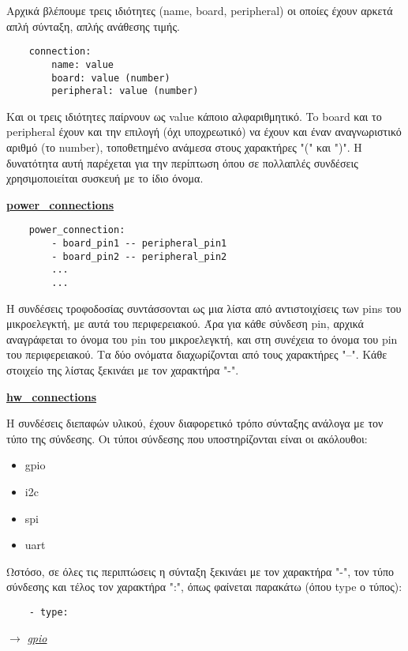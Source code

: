 Αρχικά βλέπουμε τρεις ιδιότητες (name, board, peripheral) οι οποίες έχουν αρκετά απλή σύνταξη, απλής ανάθεσης τιμής.

\begin{lstlisting}
	connection:
		name: value
		board: value (number)
		peripheral: value (number)
\end{lstlisting}

Και οι τρεις ιδιότητες παίρνουν ως value κάποιο αλφαριθμητικό. To board και το peripheral έχουν και την επιλογή (όχι υποχρεωτικό) να έχουν και έναν αναγνωριστικό αριθμό (το number), τοποθετημένο ανάμεσα στους χαρακτήρες "(" και ")". Η δυνατότητα αυτή παρέχεται για την περίπτωση όπου σε πολλαπλές συνδέσεις χρησιμοποιείται συσκευή με το ίδιο όνομα.

\textbf{\underline{power\_connections}}

\begin{lstlisting}
	power_connection:
		- board_pin1 -- peripheral_pin1
		- board_pin2 -- peripheral_pin2
		...
		...
\end{lstlisting}

Η συνδέσεις τροφοδοσίας συντάσσονται ως μια λίστα από αντιστοιχίσεις των pins του μικροελεγκτή, με αυτά του περιφερειακού. Άρα για κάθε σύνδεση pin, αρχικά αναγράφεται το όνομα του pin του μικροελεγκτή, και στη συνέχεια το όνομα του pin του περιφερειακού. Τα δύο ονόματα διαχωρίζονται από τους χαρακτήρες "--". Κάθε στοιχείο της λίστας ξεκινάει με τον χαρακτήρα "-".

\textbf{\underline{hw\_connections}}

Η συνδέσεις διεπαφών υλικού, έχουν διαφορετικό τρόπο σύνταξης ανάλογα με τον τύπο της σύνδεσης. Οι τύποι σύνδεσης που υποστηρίζονται είναι οι ακόλουθοι:

\begin{itemize}
	\item gpio
	\item i2c
	\item spi
	\item uart
\end{itemize}	

Ωστόσο, σε όλες τις περιπτώσεις η σύνταξη ξεκινάει με τον χαρακτήρα "-", τον τύπο σύνδεσης και τέλος τον χαρακτήρα ":", όπως φαίνεται παρακάτω (όπου type ο τύπος):

\begin{lstlisting}
	- type:
\end{lstlisting}

$\rightarrow$ \underline{\textit{gpio}}


